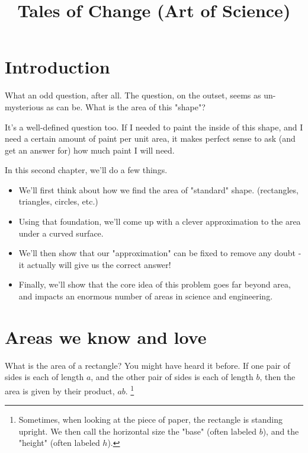 \documentclass{article}
\title{Tales of Change (Art of Science)}
\date{\vspace{-5ex}}
\begin{document}
\maketitle



\section{Introduction}

What an odd question, after all. The question, on the outset, seems as un-mysterious as can be. What is the area of this "shape"? 

It's a well-defined question too. If I needed to paint the inside of this shape, and I need a certain amount of paint per unit area, it makes perfect sense to ask (and get an answer for) how much paint I will need.


In this second chapter, we'll do a few things. 

\begin{itemize}
\item We'll first think about how we find the area of "standard" shape. (rectangles, triangles, circles, etc.)
\item Using that foundation, we'll come up with a clever approximation to the area under a curved surface. 
\item We'll then show that our "approximation" can be fixed to remove any doubt - it actually will give us the correct answer!
\item Finally, we'll show that the core idea of this problem goes far beyond area, and impacts an enormous number of areas in science and engineering.
\end{itemize}


\section{Areas we know and love}

What is the area of a rectangle? You might have heard it before. If one pair of sides is each of length $a$, and the other pair of sides is each of length $b$, then the area is given by their product, $ab$. \footnote{Sometimes, when looking at the piece of paper, the rectangle is standing upright. We then call the horizontal size the "base" (often labeled $b$), and the "height" (often labeled $h$).}
\end{document}
